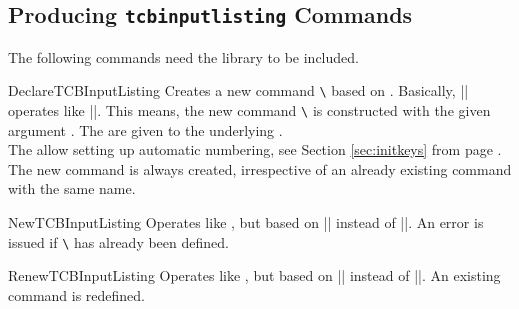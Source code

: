 \clearpage
\subsection{Producing \texttt{tcbinputlisting} Commands}\label{subsec:xparse_inputlisting}
\begin{marker}
The following commands need the  library to be included.
\end{marker}


\begin{docCommand}{DeclareTCBInputListing}{}
  Creates a new command \texttt{\textbackslash} based on .
  Basically, |\DeclareTCBInputListing| operates like |\DeclareDocumentCommand|. This means,
  the new command \texttt{\textbackslash} is constructed with the given argument .
  The  are given to the underlying .\\
  The  allow setting up automatic numbering,
  see Section \ref{sec:initkeys} from page \pageref{sec:initkeys}.\\
  The new command is always created, irrespective of an already existing
  command with the same name.

\begin{dispExample}

\end{dispExample}
  \end{docCommand}

\begin{docCommand}{NewTCBInputListing}{}
  Operates like , but based on |\NewDocumentCommand| instead of |\DeclareDocumentCommand|.
  An error is issued if \texttt{\textbackslash} has already been defined.
\end{docCommand}

\begin{docCommand}{RenewTCBInputListing}{}
  Operates like , but based on |\RenewDocumentCommand| instead of |\DeclareDocumentCommand|.
  An existing command is redefined.
\end{docCommand}

